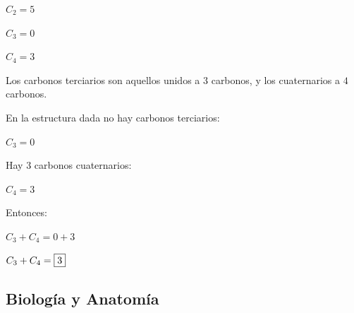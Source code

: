 \begin{enumerate}[resume]
	$C_2=5$
	
	$C_3=0$
	
	$C_4=3$
	
	Los carbonos terciarios son aquellos unidos a $3$ carbonos, y los cuaternarios a $4$ carbonos.
	
	En la estructura dada no hay carbonos terciarios:
	
	$C_3=0$
	
	Hay $3$ carbonos cuaternarios:
	
	$C_4=3$
	
	Entonces:
	
	$C_3+C_4=0+3$
	
	$C_3+C_4= \fbox{3}$
	\vspace{6mm}
	
\end{enumerate}







\subsection*{Biología y Anatomía}

